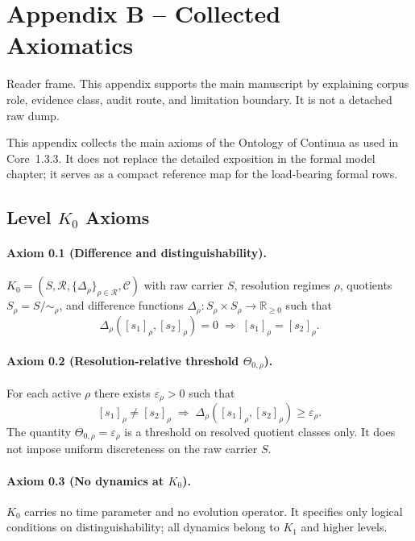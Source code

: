 
\section{Appendix B -- Collected Axiomatics}
Reader frame. This appendix supports the main manuscript by explaining corpus role, evidence class, audit route, and limitation boundary. It is not a detached raw dump.

\label{app:axioms-full}

This appendix collects the main axioms of the Ontology of Continua as used in
Core~1.3.3. It does not replace the detailed exposition in
the formal model chapter; it serves as a compact reference map for the
load-bearing formal rows.

\subsection{Level \texorpdfstring{$K_0$}{K0} Axioms}

\paragraph{Axiom 0.1 (Difference and distinguishability).}
\(K_0 = (S,\mathcal{R},\{\Delta_\rho\}_{\rho\in\mathcal{R}},\mathcal{C})\)
with raw carrier \(S\), resolution regimes \(\rho\), quotients
\(S_\rho=S/{\sim_\rho}\), and difference functions
\(\Delta_\rho:S_\rho\times S_\rho\to\mathbb{R}_{\ge 0}\) such that
\[
  \Delta_\rho([s_1]_\rho,[s_2]_\rho)=0
  \;\Rightarrow\;
  [s_1]_\rho=[s_2]_\rho.
\]

\paragraph{Axiom 0.2 (Resolution-relative threshold \texorpdfstring{\(\Theta_{0,\rho}\)}{\Theta_0,rho}).}
For each active \(\rho\) there exists \(\varepsilon_\rho>0\) such that
\[
  [s_1]_\rho\neq[s_2]_\rho
  \;\Rightarrow\;
  \Delta_\rho([s_1]_\rho,[s_2]_\rho)\ge\varepsilon_\rho.
\]
The quantity \(\Theta_{0,\rho}=\varepsilon_\rho\) is a threshold on resolved
quotient classes only. It does not impose uniform discreteness on the raw
carrier \(S\).

\paragraph{Axiom 0.3 (No dynamics at \texorpdfstring{\(K_0\)}{K_0}).}
\(K_0\) carries no time parameter and no evolution operator.  It specifies only
logical conditions on distinguishability; all dynamics belong to \(K_1\) and
higher levels.

